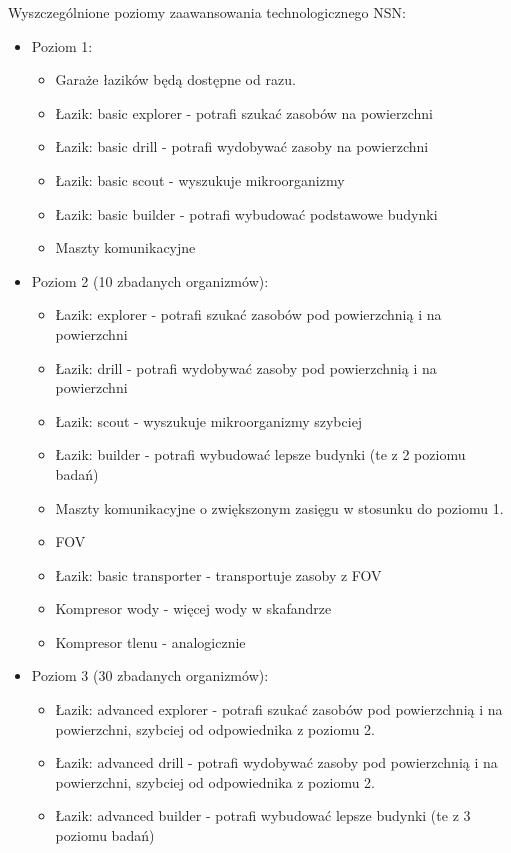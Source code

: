\documentclass[a4paper,12pt]{article}
\begin{document}
\vspace{1em}
Wyszczególnione poziomy zaawansowania technologicznego NSN:
\begin{itemize}
	\item Poziom 1:
	\begin{itemize}
		\item Garaże łazików będą dostępne od razu.
		\item Łazik: basic explorer - potrafi szukać zasobów na powierzchni
		\item Łazik: basic drill - potrafi wydobywać zasoby na powierzchni
		\item Łazik: basic scout - wyszukuje mikroorganizmy
		\item Łazik: basic builder - potrafi wybudować podstawowe budynki
		\item Maszty komunikacyjne
	\end{itemize}
	\item Poziom 2 (10 zbadanych organizmów):
	\begin{itemize}
		\item Łazik: explorer - potrafi szukać zasobów pod powierzchnią i na powierzchni
		\item Łazik: drill - potrafi wydobywać zasoby pod powierzchnią i na powierzchni
		\item Łazik: scout - wyszukuje mikroorganizmy szybciej
		\item Łazik: builder - potrafi wybudować lepsze budynki (te z 2 poziomu badań)
		\item Maszty komunikacyjne o zwiększonym zasięgu w stosunku do poziomu 1.
		\item FOV
		\item Łazik: basic transporter - transportuje zasoby z FOV
		\item Kompresor wody - więcej wody w skafandrze
		\item Kompresor tlenu - analogicznie
	\end{itemize}
	\item Poziom 3 (30 zbadanych organizmów):
	\begin{itemize}
		\item Łazik: advanced explorer - potrafi szukać zasobów pod powierzchnią i na powierzchni, szybciej od odpowiednika z poziomu 2.
		\item Łazik: advanced drill - potrafi wydobywać zasoby pod powierzchnią i na powierzchni, szybciej od odpowiednika z poziomu 2.
		\item Łazik: advanced builder - potrafi wybudować lepsze budynki (te z 3 poziomu badań)

\end{itemize}
\end{itemize}
\end{document}
